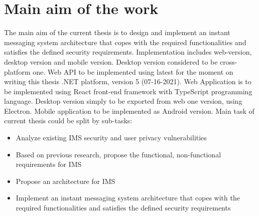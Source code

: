 \chapter{Main aim of the work}\label{ch:main-aim-of-the-work}

The main aim of the current thesis is to design and implement an instant messaging system architecture that copes with the required functionalities and
satisfies the defined security requirements.
Implementation includes web-version, desktop version and mobile version.
Desktop version considered to be cross-platform one.
Web API to be implemented using latest for the moment on writing this thesis .NET platform, version 5 (07-16-2021).
Web Application is to be implemented using React front-end framework with TypeScript programming language.
Desktop version simply to be exported from web one version, using Electron.
Mobile application to be implemented as Android version.
Main task of current thesis could be split by sub-tasks:
\begin{itemize}
    \item Analyze existing IMS security and user privacy vulnerabilities
    \item Based on previous research, propose the functional, non-functional requirements for IMS
    \item Propose an architecture for IMS
    \item Implement an instant messaging system architecture that copes with the required functionalities and
    satisfies the defined security requirements
\end{itemize}